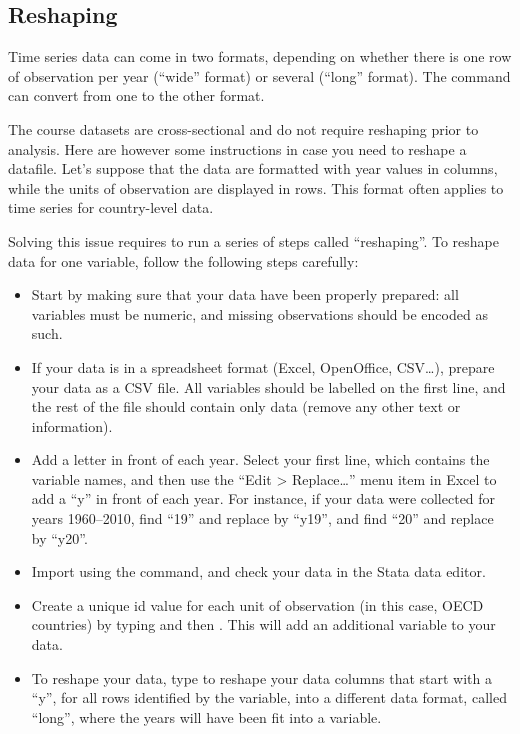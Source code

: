 %
\subsection{Reshaping}

Time series data can come in two formats, depending on whether there is one row of observation per year (\enquote{wide} format) or several (\enquote{long} format). The  command can convert from one to the other format.
    
The course datasets are cross-sectional and do not require reshaping prior to analysis. Here are however some instructions in case you need to reshape a datafile. Let's suppose that the data are formatted with year values in columns, while the units of observation are displayed in rows. This format often applies to time series for country-level data.

Solving this issue requires to run a series of steps called \enquote{reshaping}. To reshape data for one variable, follow the following steps carefully:

\begin{itemize}
 \item Start by making sure that your data have been properly prepared: all variables must be numeric, and missing observations should be encoded as such.
 \item If your data is in a spreadsheet format (Excel, OpenOffice, CSV\dots), prepare your data as a CSV file. All variables should be labelled on the first line, and the rest of the file should contain only data (remove any other text or information). 
 \item Add a letter in front of each year. Select your first line, which contains the variable names, and then use the \enquote{Edit > Replace\dots} menu item in Excel to add a \enquote{y} in front of each year. For instance, if your data were collected for years 1960–2010, find \enquote{19} and replace by \enquote{y19}, and find \enquote{20} and replace by \enquote{y20}.
 \item Import using the  command, and check your data in the Stata data editor.
 \item Create a unique id value for each unit of observation (in this case, OECD countries) by typing  and then . This will add an additional variable to your data.
 \item To reshape your data, type  to reshape your data columns that start with a \enquote{y}, for all rows identified by the  variable, into a different data format, called \enquote{long}, where the years will have been fit into a  variable.
 
\end{itemize}

